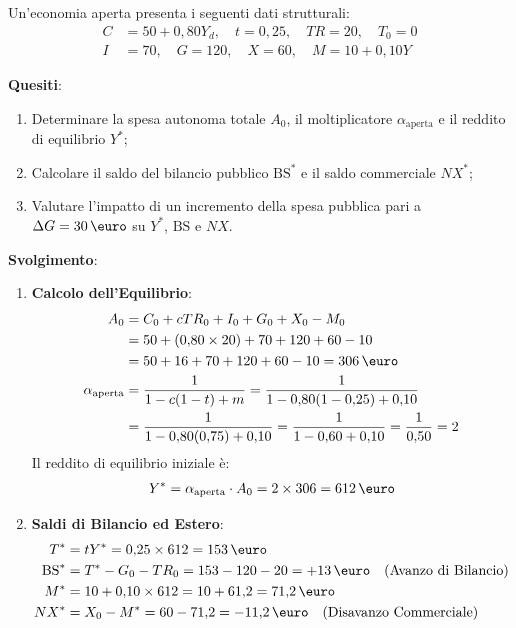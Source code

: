 \begin{esercizio}
Un'economia aperta presenta i seguenti dati strutturali:
\begin{align*}
    C &= 50 + 0{,}80 Y_d, \quad t = 0{,}25, \quad TR = 20, \quad T_0 = 0 \\
    I &= 70, \quad G = 120, \quad X = 60, \quad M = 10 + 0{,}10 Y
\end{align*}

\textbf{Quesiti}:
\begin{enumerate}
    \item Determinare la spesa autonoma totale $A_0$, il moltiplicatore $\alpha_{\text{aperta}}$ e il reddito di equilibrio $Y^*$;
    \item Calcolare il saldo del bilancio pubblico $\mathrm{BS}^*$ e il saldo commerciale $NX^*$;
    \item Valutare l'impatto di un incremento della spesa pubblica pari a $\Delta G = 30\,\text{\euro}$ su $Y^*$, $\mathrm{BS}$ e $NX$.
\end{enumerate}

\textbf{Svolgimento}:
\begin{enumerate}
    \item \textbf{Calcolo dell'Equilibrio}:
    \begin{align*}
        A_0 &= C_0 + c TR_0 + I_0 + G_0 + X_0 - M_0 \\
            &= 50 + (0{,}80 \times 20) + 70 + 120 + 60 - 10 \\
            &= 50 + 16 + 70 + 120 + 60 - 10 = 306\,\text{\euro} \\
        \alpha_{\text{aperta}} &= \frac{1}{1 - c(1-t) + m} = \frac{1}{1 - 0{,}80(1 - 0{,}25) + 0{,}10} \\
                              &= \frac{1}{1 - 0{,}80(0{,}75) + 0{,}10} = \frac{1}{1 - 0{,}60 + 0{,}10} = \frac{1}{0{,}50} = 2
    \end{align*}
    Il reddito di equilibrio iniziale è:
    \begin{equation*}
        Y^* = \alpha_{\text{aperta}} \cdot A_0 = 2 \times 306 = 612\,\text{\euro}
    \end{equation*}

    \item \textbf{Saldi di Bilancio ed Estero}:
    \begin{align*}
        T^* &= t Y^* = 0{,}25 \times 612 = 153\,\text{\euro} \\
        \mathrm{BS}^* &= T^* - G_0 - TR_0 = 153 - 120 - 20 = +13\,\text{\euro} \quad (\text{Avanzo di Bilancio}) \\
        M^* &= 10 + 0{,}10 \times 612 = 10 + 61{,}2 = 71{,}2\,\text{\euro} \\
        NX^* &= X_0 - M^* = 60 - 71{,}2 = -11{,}2\,\text{\euro} \quad (\text{Disavanzo Commerciale})
    \end{align*}


\end{enumerate}
\end{esercizio}
